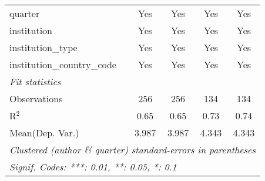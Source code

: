 \begin{tabular}{lcccc}
   quarter                                  & Yes    & Yes     & Yes    & Yes\\  
   institution                              & Yes    & Yes     & Yes    & Yes\\  
   institution\_type                        & Yes    & Yes     & Yes    & Yes\\  
   institution\_country\_code               & Yes    & Yes     & Yes    & Yes\\  
   \midrule
   \emph{Fit statistics}\\
   Observations                             & 256    & 256     & 134    & 134\\  
   R$^2$                                    & 0.65   & 0.65    & 0.73   & 0.74\\  
Mean(Dep. Var.) & 3.987 & 3.987 & 4.343 & 4.343 \\
   \midrule \midrule
   \multicolumn{5}{l}{\emph{Clustered (author \& quarter) standard-errors in parentheses}}\\
   \multicolumn{5}{l}{\emph{Signif. Codes: ***: 0.01, **: 0.05, *: 0.1}}\\
\end{tabular}
\par\endgroup
